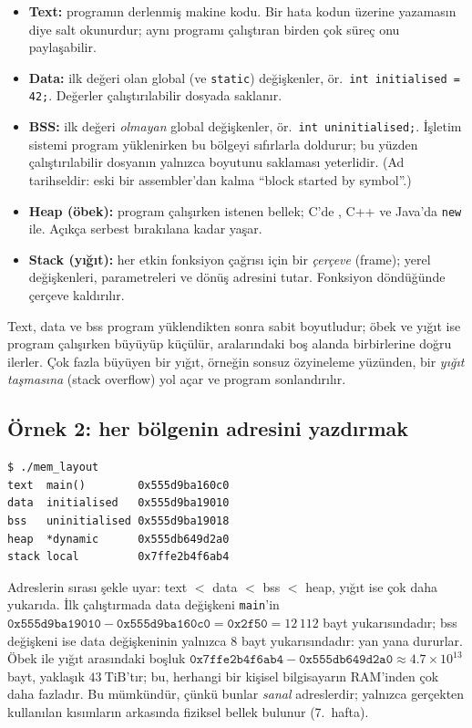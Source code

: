 \begin{itemize}
  \item \textbf{Text:} programın derlenmiş makine kodu. Bir hata kodun üzerine yazamasın diye salt okunurdur; aynı programı çalıştıran birden çok süreç onu paylaşabilir.
  \item \textbf{Data:} ilk değeri olan global (ve \texttt{static}) değişkenler, ör.\ \texttt{int initialised = 42;}. Değerler çalıştırılabilir dosyada saklanır.
  \item \textbf{BSS:} ilk değeri \emph{olmayan} global değişkenler, ör.\ \texttt{int uninitialised;}. İşletim sistemi program yüklenirken bu bölgeyi sıfırlarla doldurur; bu yüzden çalıştırılabilir dosyanın yalnızca boyutunu saklaması yeterlidir. (Ad tarihseldir: eski bir assembler'dan kalma ``block started by symbol''.)
  \item \textbf{Heap (öbek):} program çalışırken istenen bellek; C'de , C++ ve Java'da \texttt{new} ile. Açıkça serbest bırakılana kadar yaşar.
  \item \textbf{Stack (yığıt):} her etkin fonksiyon çağrısı için bir \emph{çerçeve} (frame); yerel değişkenleri, parametreleri ve dönüş adresini tutar. Fonksiyon döndüğünde çerçeve kaldırılır.
\end{itemize}

Text, data ve bss program yüklendikten sonra sabit boyutludur; öbek ve yığıt ise program çalışırken büyüyüp küçülür, aralarındaki boş alanda birbirlerine doğru ilerler. Çok fazla büyüyen bir yığıt, örneğin sonsuz özyineleme yüzünden, bir \emph{yığıt taşmasına} (stack overflow) yol açar ve program sonlandırılır.

\subsection{Örnek 2: her bölgenin adresini yazdırmak}



\begin{lstlisting}[style=term]
$ ./mem_layout
text  main()        0x555d9ba160c0
data  initialised   0x555d9ba19010
bss   uninitialised 0x555d9ba19018
heap  *dynamic      0x555db649d2a0
stack local         0x7ffe2b4f6ab4
\end{lstlisting}

Adreslerin sırası şekle uyar: text $<$ data $<$ bss $<$ heap, yığıt ise çok daha yukarıda. İlk çalıştırmada data değişkeni \texttt{main}'in $\texttt{0x555d9ba19010} - \texttt{0x555d9ba160c0} = \texttt{0x2f50} = 12\,112$ bayt yukarısındadır; bss değişkeni ise data değişkeninin yalnızca $8$ bayt yukarısındadır: yan yana dururlar. Öbek ile yığıt arasındaki boşluk $\texttt{0x7ffe2b4f6ab4} - \texttt{0x555db649d2a0} \approx 4.7\times10^{13}$ bayt, yaklaşık $43\ \text{TiB}$'tır; bu, herhangi bir kişisel bilgisayarın RAM'inden çok daha fazladır. Bu mümkündür, çünkü bunlar \emph{sanal} adreslerdir; yalnızca gerçekten kullanılan kısımların arkasında fiziksel bellek bulunur (7.~hafta).

